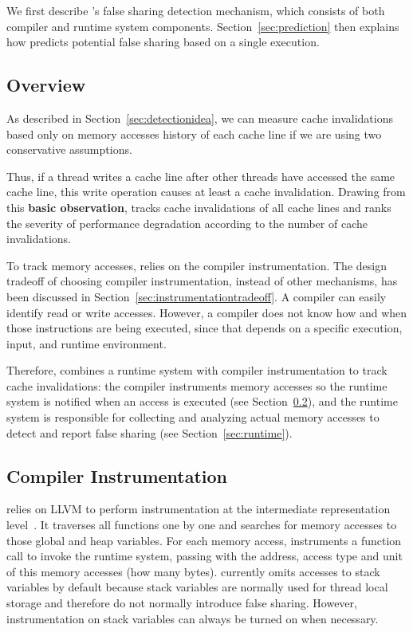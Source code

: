 \label{sec:detection}

We first describe \Predator{}'s false sharing detection mechanism, which consists of both compiler and runtime system components. Section~\ref{sec:prediction} then explains how \Predator{} predicts potential false sharing based on a single execution.

\subsection{Overview}
\label{sec:overview}
As described in Section~\ref{sec:detectionidea}, we can measure cache invalidations based only on memory accesses history of each cache line if we are using two conservative assumptions. 

Thus, if a thread writes a cache line after other threads have accessed the same cache line, this write operation causes at least a cache invalidation. Drawing from this \textbf{basic observation}, \Predator{} tracks cache invalidations of all cache lines and ranks the severity of performance degradation  according to the number of cache invalidations. 
 
To track memory accesses, \Predator{} relies on the compiler instrumentation. The design tradeoff of choosing compiler instrumentation, instead of other mechanisms, has been discussed in Section~\ref{sec:instrumentationtradeoff}. A compiler can easily identify read or write accesses. However, a compiler does not know how and when those instructions are being executed, since that depends on a specific execution, input, and runtime environment.

Therefore, \Predator{} combines a runtime system with compiler instrumentation to track cache invalidations: the compiler instruments memory accesses so the runtime system is notified when an access is executed (see Section~\ref{sec:compiler}), and the runtime system is responsible for collecting and analyzing actual memory accesses to detect and report false sharing (see Section~\ref{sec:runtime}).

\subsection{Compiler Instrumentation}
\label{sec:compiler}

\Predator{} relies on LLVM to perform instrumentation at the intermediate representation level~\cite{llvm}.
It traverses all functions one by one and searches for memory accesses to those global and heap variables.  For each memory access, \Predator{} instruments a function call to invoke the runtime system, passing with the address, access type and unit of this memory accesses (how many bytes). \Predator{} currently omits accesses to stack variables by default because stack variables are normally used for thread local storage and therefore do not normally introduce false sharing. However, instrumentation on stack variables
can always be turned on when necessary.


